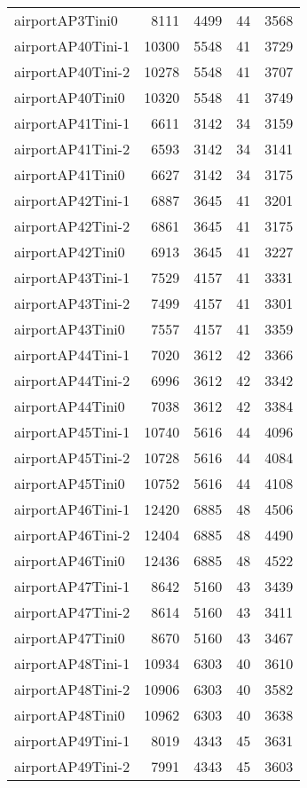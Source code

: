\begin{longtable}{lrrrr}
airportAP3Tini0 & 8111 & 4499 & 44 & 3568 \\
airportAP40Tini-1 & 10300 & 5548 & 41 & 3729 \\
airportAP40Tini-2 & 10278 & 5548 & 41 & 3707 \\
airportAP40Tini0 & 10320 & 5548 & 41 & 3749 \\
airportAP41Tini-1 & 6611 & 3142 & 34 & 3159 \\
airportAP41Tini-2 & 6593 & 3142 & 34 & 3141 \\
airportAP41Tini0 & 6627 & 3142 & 34 & 3175 \\
airportAP42Tini-1 & 6887 & 3645 & 41 & 3201 \\
airportAP42Tini-2 & 6861 & 3645 & 41 & 3175 \\
airportAP42Tini0 & 6913 & 3645 & 41 & 3227 \\
airportAP43Tini-1 & 7529 & 4157 & 41 & 3331 \\
airportAP43Tini-2 & 7499 & 4157 & 41 & 3301 \\
airportAP43Tini0 & 7557 & 4157 & 41 & 3359 \\
airportAP44Tini-1 & 7020 & 3612 & 42 & 3366 \\
airportAP44Tini-2 & 6996 & 3612 & 42 & 3342 \\
airportAP44Tini0 & 7038 & 3612 & 42 & 3384 \\
airportAP45Tini-1 & 10740 & 5616 & 44 & 4096 \\
airportAP45Tini-2 & 10728 & 5616 & 44 & 4084 \\
airportAP45Tini0 & 10752 & 5616 & 44 & 4108 \\
airportAP46Tini-1 & 12420 & 6885 & 48 & 4506 \\
airportAP46Tini-2 & 12404 & 6885 & 48 & 4490 \\
airportAP46Tini0 & 12436 & 6885 & 48 & 4522 \\
airportAP47Tini-1 & 8642 & 5160 & 43 & 3439 \\
airportAP47Tini-2 & 8614 & 5160 & 43 & 3411 \\
airportAP47Tini0 & 8670 & 5160 & 43 & 3467 \\
airportAP48Tini-1 & 10934 & 6303 & 40 & 3610 \\
airportAP48Tini-2 & 10906 & 6303 & 40 & 3582 \\
airportAP48Tini0 & 10962 & 6303 & 40 & 3638 \\
airportAP49Tini-1 & 8019 & 4343 & 45 & 3631 \\
airportAP49Tini-2 & 7991 & 4343 & 45 & 3603 \\

\end{longtable}
